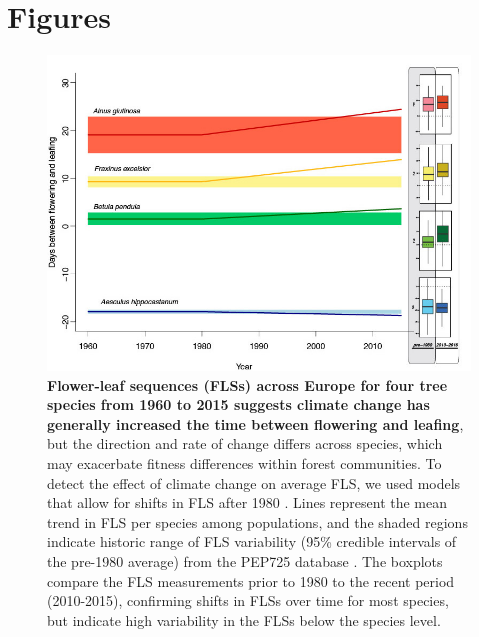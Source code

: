 \documentclass[11pt]{article}
\begin{document}
\section*{Figures}


\begin{figure}[h!]
    \centering
 \includegraphics[width=\textwidth]{..//..//PEP725/FLS_climate_change_final.jpg}
    \caption{\textbf{Flower-leaf sequences (FLSs) across Europe for four tree species from 1960 to 2015 suggests climate change has generally increased the time between flowering and leafing}, but the direction and rate of change differs across species, which may exacerbate fitness differences within forest communities. To detect the effect of climate change on average FLS, we used models that allow for shifts in FLS after 1980 \citep{Kharouba2018}. Lines represent the mean trend in FLS per species among populations, and the shaded regions indicate historic range of FLS variability (95\% credible intervals of the pre-1980 average) from the PEP725 database \citep{PEP725}. The boxplots compare the FLS measurements prior to 1980 to the recent period (2010-2015), confirming shifts in FLSs over time for most species, but indicate high variability in the FLSs below the species level.}
    \label{fig:climchange}
\end{figure}
\end{document}
